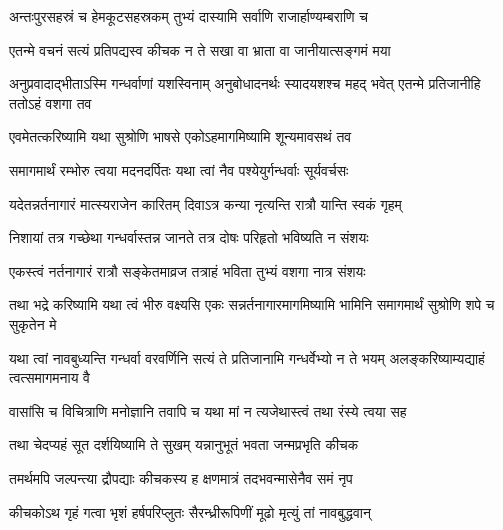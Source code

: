 \twolineshloka
{अन्तःपुरसहस्रं च हेमकूटसहस्रकम्}
{तुभ्यं दास्यामि सर्वाणि राजार्हाण्यम्बराणि च}




\twolineshloka
{एतन्मे वचनं सत्यं प्रतिपद्यस्व कीचक}
{न ते सखा वा भ्राता वा जानीयात्सङ्गमं मया}


\threelineshloka
{अनुप्रवादाद्भीताऽस्मि गन्धर्वाणां यशस्विनाम्}
{अनुबोधादनर्थः स्यादयशश्च महद् भवेत्}
{एतन्मे प्रतिजानीहि ततोऽहं वशगा तव}




\twolineshloka
{एवमेतत्करिष्यामि यथा सुश्रोणि भाषसे}
{एकोऽहमागमिष्यामि शून्यमावसथं तव}


\twolineshloka
{समागमार्थं रम्भोरु त्वया मदनदर्पितः}
{यथा त्वां नैव पश्येयुर्गन्धर्वाः सूर्यवर्चसः}




\twolineshloka
{यदेतन्नर्तनागारं मात्स्यराजेन कारितम्}
{दिवाऽत्र कन्या नृत्यन्ति रात्रौ यान्ति स्वकं गृहम्}


\twolineshloka
{निशायां तत्र गच्छेथा गन्धर्वास्तन्न जानते}
{तत्र दोषः परिहृतो भविष्यति न संशयः}


\twolineshloka
{एकस्त्वं नर्तनागारं रात्रौ सङ्केतमाव्रज}
{तत्राहं भविता तुभ्यं वशगा नात्र संशयः}




\threelineshloka
{तथा भद्रे करिष्यामि यथा त्वं भीरु वक्ष्यसि}
{एकः सन्नर्तनागारमागमिष्यामि भामिनि}
{समागमार्थं सुश्रोणि शपे च सुकृतेन मे}


\threelineshloka
{यथा त्वां नावबुध्यन्ति गन्धर्वा वरवर्णिनि}
{सत्यं ते प्रतिजानामि गन्धर्वेभ्यो न ते भयम्}
{अलङ्करिष्याम्यद्याहं त्वत्समागमनाय वै}


\twolineshloka
{वासांसि च विचित्राणि मनोज्ञानि तवापि च}
{यथा मां न त्यजेथास्त्वं तथा रंस्ये त्वया सह}




\twolineshloka
{तथा चेदप्यहं सूत दर्शयिष्यामि ते सुखम्}
{यन्नानुभूतं भवता जन्मप्रभृति कीचक}



\twolineshloka
{तमर्थमपि जल्पन्त्या द्रौपद्याः कीचकस्य ह}
{क्षणमात्रं तदभवन्मासेनैव समं नृप}


\twolineshloka
{कीचकोऽथ गृहं गत्वा भृशं हर्षपरिप्लुतः}
{सैरन्ध्रीरूपिणीं मूढो मृत्युं तां नावबुद्धवान्}


